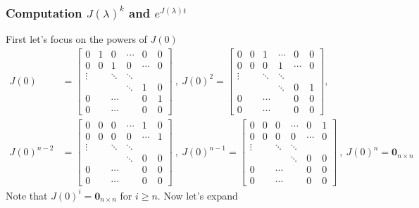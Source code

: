 \documentclass[twoside]{article}
\begin{document}
\subsubsection{Computation $J(\lambda)^k$ and $ e^{J(\lambda) t} $}

First let's focus on the powers of $J(0)$
%
\begin{align*}
J(0) &= \left[  \begin{array}{cccccc} 0 & 1 & 0 & \cdots & 0 & 0  \\ 0 & 0 & 1 & 0 & \cdots  & 0 \\ 
\vdots &  & \ddots & \ddots &  \\ & & & \ddots & 1 & 0 \\ 0 &  & \cdots  &  & 0 & 1 \\
0 &  & \cdots &  & 0 & 0 \end{array} \right]  \ , \ 
J(0)^2 = \left[  \begin{array}{cccccc} 0 & 0 & 1 & \cdots & 0 & 0  
\\ 0 & 0 & 0 & 1 & \cdots  & 0 \\ 
\vdots &  & \ddots & \ddots &  \\ & & & \ddots & 0 & 1 \\ 0 &  & \cdots  &  & 0 & 0 \\
0 &  & \cdots &  & 0 & 0 \end{array} \right] , 
\\
J(0)^{n-2} &= \left[  \begin{array}{cccccc} 0 & 0 & 0 & \cdots & 1 & 0  
\\ 0 & 0 & 0 & 0 & \cdots  & 1 \\ 
\vdots &  & \ddots & \ddots &  \\ & & & \ddots & 0 & 0 \\ 0 &  & \cdots  &  & 0 & 0 \\
0 &  & \cdots &  & 0 & 0 \end{array} \right] 
\ , \ 
J(0)^{n-1} = \left[  \begin{array}{cccccc} 0 & 0 & 0 & \cdots & 0 & 1  
\\ 0 & 0 & 0 & 0 & \cdots  & 0 \\ 
\vdots &  & \ddots & \ddots &  \\ & & & \ddots & 0 & 0 \\ 0 &  & \cdots  &  & 0 & 0 \\
0 &  & \cdots &  & 0 & 0 \end{array} \right] \ , \ J(0)^n = \mathbf{0}_{n \times n}
\end{align*}
%
Note that $J(0)^i = \mathbf{0}_{n \times n}$ for $i \geq n$. Now let's expand 
\end{document}

